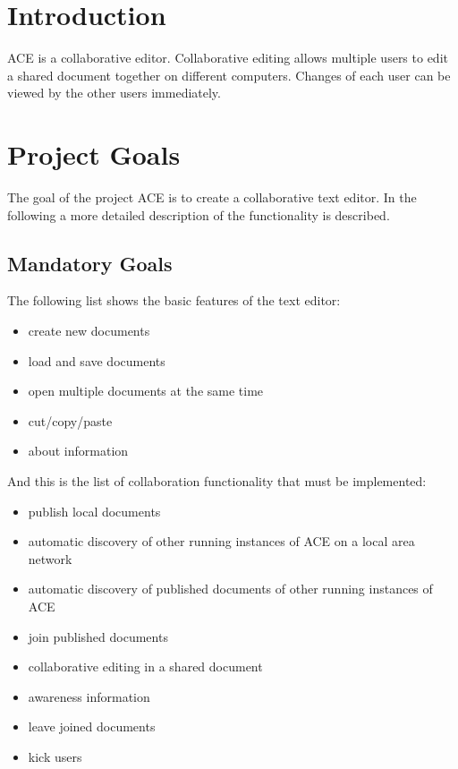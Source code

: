 \documentclass[11pt,a4paper]{article}
\begin{document}


\section{Introduction}

ACE is a collaborative editor. Collaborative editing allows multiple users
to edit a shared document together on different computers. Changes of each user can be viewed 
by the other users immediately.

\section{Project Goals}

The goal of the project ACE is to create a collaborative text editor. In the following a more detailed
description of the functionality is described.

\subsection{Mandatory Goals}

The following list shows the basic features of the text editor:

\begin{itemize}
 \item create new documents
 \item load and save documents
 \item open multiple documents at the same time
 \item cut/copy/paste
 \item about information
\end{itemize}

And this is the list of collaboration functionality that must be implemented:

\begin{itemize}
 \item publish local documents
 \item automatic discovery of other running instances of ACE on a local area network
 \item automatic discovery of published documents of other running instances of ACE
 \item join published documents
 \item collaborative editing in a shared document
 \item awareness information
 \item leave joined documents
 \item kick users
\end{itemize}
\end{document}
